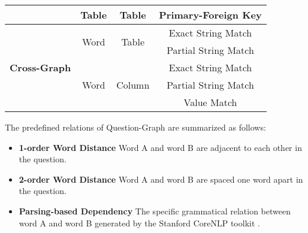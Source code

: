 \documentclass{article}
\begin{document}
\begin{table*}[hbt]
\begin{tabular}{c|c|c|c}
                                                                        \cline{2-4}
                                                                        & Table                     & Table                             & Primary-Foreign Key   \\                         
\hline                             
\multirow{5}{*}{\textbf{Cross-Graph}}                                   & \multirow{2}{*}{Word}     & \multirow{2}{*}{Table}            & Exact String Match    \\   
                                                                        &                           &                                   & Partial String Match  \\   
                                                                        \cline{2-4} 
                                                                        & \multirow{3}{*}{Word}     & \multirow{3}{*}{Column}           & Exact String Match    \\    
                                                                        &                           &                                   & Partial String Match  \\
                                                                        &                           &                                   & Value Match           \\
\hline
\end{tabular}
\label{relation_table}
\end{table*}

The predefined relations of Question-Graph are summarized as follows:
\begin{itemize}
    \item \textbf{1-order Word Distance}
Word A and word B are adjacent to each other in the question. 
    \item \textbf{2-order Word Distance}
Word A and word B are spaced one word apart in the question.
    \item \textbf{Parsing-based Dependency}
The specific grammatical relation between word A and word B generated by the Stanford CoreNLP toolkit \citep{manning2014stanford}.  
\end{itemize}
   
\end{document}
